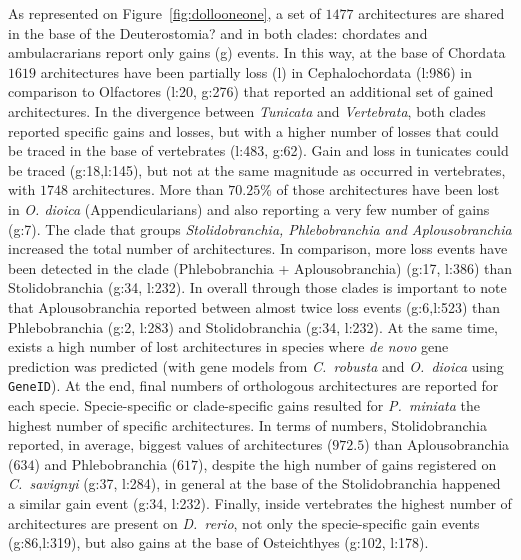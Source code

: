 \documentclass[11pt]{article}
\newcommand{\TODO}[1]{\begingroup\color{red}#1\endgroup}
\begin{document}
As represented on Figure~\ref{fig:dollooneone},  a set of $1477$ architectures 
are shared in the base of the \TODO{Deuterostomia?} and in both clades: 
chordates and ambulacrarians report only gains (g) events. In this way, at the 
base of Chordata $1619$ architectures have been partially loss (l) in Cephalochordata
(l:986) in comparison to Olfactores (l:20, g:276) that reported an additional 
set of gained architectures. In the divergence between \textit{Tunicata} 
and \textit{Vertebrata}, both clades reported specific gains and losses, but with a 
higher number of losses that could be traced in the base of vertebrates (l:483, g:62).
Gain and loss in tunicates could be traced (g:18,l:145), but not at the same magnitude
as occurred in vertebrates, with $1748$ architectures. More than $70.25$\% of those architectures have been lost in \textit{O. dioica} (Appendicularians) and also reporting 
a very few number of gains (g:7). \TODO{The clade that groups} \textsl{Stolidobranchia, Phlebobranchia and Aplousobranchia} increased the total number of architectures. 
In comparison, more loss events have been detected in the clade (Phlebobranchia +
Aplousobranchia) (g:17, l:386) than Stolidobranchia (g:34, l:232). In overall through
those clades is important to note that Aplousobranchia reported 
between almost twice loss events (g:6,l:523) than Phlebobranchia (g:2, l:283) and Stolidobranchia (g:34, l:232). At the same time, exists a high number of lost 
architectures in species where \textit{de novo} gene prediction was predicted (with 
gene models from \textit{C.\ robusta} and \textit{O.\ dioica} using \texttt{GeneID}). At 
the end, final numbers of orthologous architectures are reported for each 
specie. Specie-specific or clade-specific gains resulted for \textit{P.\ miniata} 
the highest number of specific architectures. In terms of numbers, 
Stolidobranchia reported, in average, biggest values of architectures ($972.5$) 
than Aplousobranchia ($634$) and Phlebobranchia ($617$), despite the high number 
of gains registered on \textit{C.\ savignyi} (g:37, l:284), in general at the 
base of the Stolidobranchia happened a similar gain event (g:34, l:232). 
Finally, inside vertebrates the highest number of architectures are present on 
\textit{D.\ rerio}, not only the specie-specific gain events (g:86,l:319), but also 
gains at the base of Osteichthyes (g:102, l:178).
\end{document}
